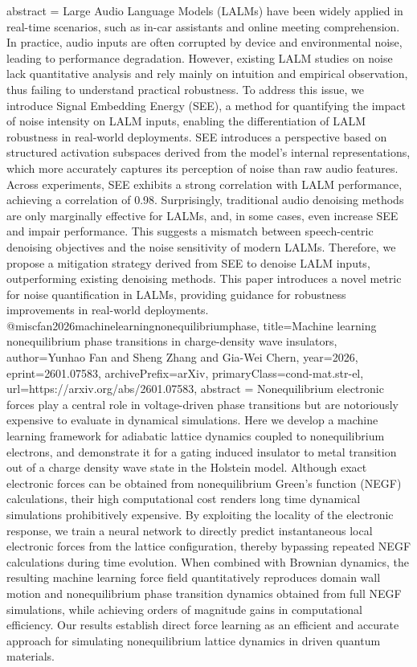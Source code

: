 {      abstract = {Large Audio Language Models (LALMs) have been widely applied in real-time scenarios, such as in-car assistants and online meeting comprehension. In practice, audio inputs are often corrupted by device and environmental noise, leading to performance degradation. However, existing LALM studies on noise lack quantitative analysis and rely mainly on intuition and empirical observation, thus failing to understand practical robustness. To address this issue, we introduce Signal Embedding Energy (SEE), a method for quantifying the impact of noise intensity on LALM inputs, enabling the differentiation of LALM robustness in real-world deployments. SEE introduces a perspective based on structured activation subspaces derived from the model's internal representations, which more accurately captures its perception of noise than raw audio features. Across experiments, SEE exhibits a strong correlation with LALM performance, achieving a correlation of 0.98. Surprisingly, traditional audio denoising methods are only marginally effective for LALMs, and, in some cases, even increase SEE and impair performance. This suggests a mismatch between speech-centric denoising objectives and the noise sensitivity of modern LALMs. Therefore, we propose a mitigation strategy derived from SEE to denoise LALM inputs, outperforming existing denoising methods. This paper introduces a novel metric for noise quantification in LALMs, providing guidance for robustness improvements in real-world deployments.}
}@misc{fan2026machinelearningnonequilibriumphase,
      title={Machine learning nonequilibrium phase transitions in charge-density wave insulators}, 
      author={Yunhao Fan and Sheng Zhang and Gia-Wei Chern},
      year={2026},
      eprint={2601.07583},
      archivePrefix={arXiv},
      primaryClass={cond-mat.str-el},
      url={https://arxiv.org/abs/2601.07583},
      abstract = {Nonequilibrium electronic forces play a central role in voltage-driven phase transitions but are notoriously expensive to evaluate in dynamical simulations. Here we develop a machine learning framework for adiabatic lattice dynamics coupled to nonequilibrium electrons, and demonstrate it for a gating induced insulator to metal transition out of a charge density wave state in the Holstein model. Although exact electronic forces can be obtained from nonequilibrium Green's function (NEGF) calculations, their high computational cost renders long time dynamical simulations prohibitively expensive. By exploiting the locality of the electronic response, we train a neural network to directly predict instantaneous local electronic forces from the lattice configuration, thereby bypassing repeated NEGF calculations during time evolution. When combined with Brownian dynamics, the resulting machine learning force field quantitatively reproduces domain wall motion and nonequilibrium phase transition dynamics obtained from full NEGF simulations, while achieving orders of magnitude gains in computational efficiency. Our results establish direct force learning as an efficient and accurate approach for simulating nonequilibrium lattice dynamics in driven quantum materials.}
}
